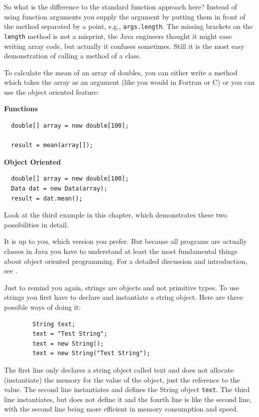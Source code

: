 So what is the difference to the standard function approach here?
Instead of using function arguments you supply the argument by 
putting them in front of the method separated by a point, e.g., 
\verb|args.length|. The missing brackets on the \verb|length| method
is not a misprint, the Java engineers thought it might ease writing
array code, but actually it confuses sometimes. Still it is the
most easy demonstration of calling a method of a class.

To calculate the mean of an array of doubles, you can
either write a method which takes the array as an argument (like you would
in Fortran or C) or you can use the object
oriented feature:

\begin{small}
\begin{minipage}{.47\textwidth}
\textbf{Functions}
\begin{verbatim}
  double[] array = new double[100]; 

  result = mean(array[]); 
\end{verbatim}
\end{minipage}
\begin{minipage}{.47\textwidth}
\textbf{Object Oriented}
\begin{verbatim}
  double[] array = new double[100]; 
  Data dat = new Data(array); 
  result = dat.mean();
\end{verbatim}
\end{minipage}
\end{small}

Look at the third example in this chapter, which demonstrates these two
possibilities in detail.

It is up to you, which version you prefer. But because all programs are
actually classes in Java you have to understand at least the 
most fundamental things about object oriented programming. For a detailed
discussion and introduction, see \cite{javanutshell}.

Just to remind you again, strings are objects and not primitive 
types. To use strings you first have to declare and instantiate a string
object. Here are three possible ways of doing it:
\begin{verbatim}
        String text;
        text = "Test String";
        text = new String();
        text = new String("Test String");
\end{verbatim}
The first line only declares a string object called text and does not
allocate (instantiate) the memory for the value of the object, just
the reference to the value. The second line instantiates and 
defines the String object \verb|text|. The third line instantiates, but
does not define it and the fourth line is like the second line, with
the second line being more efficient in memory consumption and
speed.

